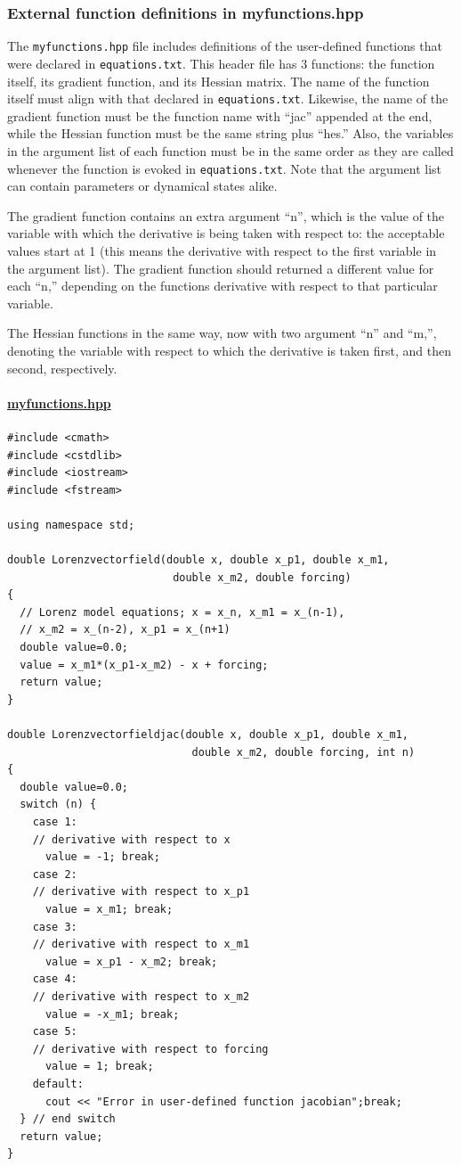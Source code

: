 \documentclass[11pt]{article}
\begin{document}
{\subsubsection{External function definitions in myfunctions.hpp}

The \texttt{myfunctions.hpp} file includes definitions of the user-defined functions that were declared in \texttt{equations.txt}. This header file has 3 functions: the function itself, its gradient function, and its Hessian matrix. The name of the function itself must align with that declared in \texttt{equations.txt}. Likewise, the name of the gradient function must be the function name with ``jac'' appended at the end, while the Hessian function must be the same string plus ``hes.'' Also, the variables in the argument list of each function must be in the same order as they are called whenever the function is evoked in \texttt{equations.txt}. Note that the argument list can contain parameters or dynamical states alike. 

The gradient function contains an extra argument ``n'', which is the value of the variable with which the derivative is being taken with respect to: the acceptable values start at 1 (this means the derivative with respect to the first variable in the argument list). The gradient function should returned a different value for each ``n,'' depending on the functions derivative with respect to that particular variable.

The Hessian functions in the same way, now with two argument ``n'' and ``m,'', denoting the variable with respect to which the derivative is taken first, and then second, respectively. 


\paragraph{\underline{myfunctions.hpp}}


\begin{verbatim}
#include <cmath>
#include <cstdlib>
#include <iostream>
#include <fstream>

using namespace std;

double Lorenzvectorfield(double x, double x_p1, double x_m1, 
                          double x_m2, double forcing)
{
  // Lorenz model equations; x = x_n, x_m1 = x_(n-1), 
  // x_m2 = x_(n-2), x_p1 = x_(n+1)
  double value=0.0;
  value = x_m1*(x_p1-x_m2) - x + forcing;
  return value;
}

double Lorenzvectorfieldjac(double x, double x_p1, double x_m1, 
                             double x_m2, double forcing, int n)
{
  double value=0.0;
  switch (n) {
    case 1:
    // derivative with respect to x
      value = -1; break;
    case 2:
    // derivative with respect to x_p1
      value = x_m1; break;
    case 3:
    // derivative with respect to x_m1
      value = x_p1 - x_m2; break;
    case 4:
    // derivative with respect to x_m2
      value = -x_m1; break;
    case 5:
    // derivative with respect to forcing
      value = 1; break;
    default:
      cout << "Error in user-defined function jacobian";break;
  } // end switch
  return value;
}


\end{verbatim}}
\end{document}
